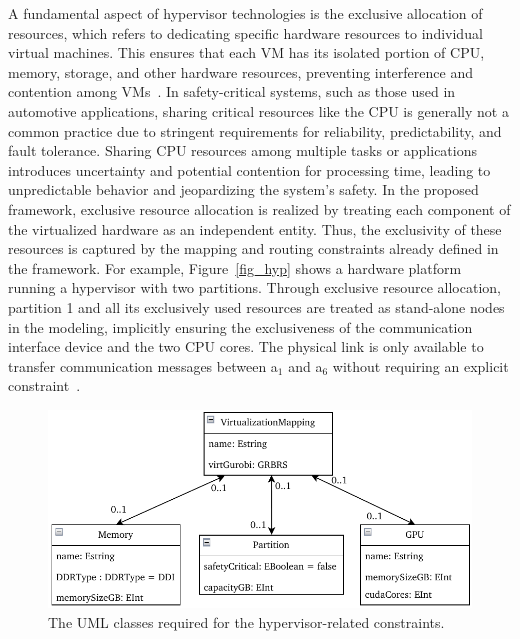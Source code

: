         
        A fundamental aspect of hypervisor technologies is the exclusive allocation of resources, which refers to dedicating specific hardware resources to individual virtual machines. This ensures that each VM has its isolated portion of CPU, memory, storage, and other hardware resources, preventing interference and contention among VMs~\cite{9968908}.
        In safety-critical systems, such as those used in automotive applications, sharing critical resources like the CPU is generally not a common practice due to stringent requirements for reliability, predictability, and fault tolerance. Sharing CPU resources among multiple tasks or applications introduces uncertainty and potential contention for processing time, leading to unpredictable behavior and jeopardizing the system's safety.
        In the proposed framework, exclusive resource allocation is realized by treating each component of the virtualized hardware as an independent entity. Thus, the exclusivity of these resources is captured by the mapping and routing constraints already defined in the framework. For example, Figure~\ref{fig_hyp} shows a hardware platform running a hypervisor with two partitions. Through exclusive resource allocation, partition 1 and all its exclusively used resources are treated as stand-alone nodes in the modeling, implicitly ensuring the exclusiveness of the communication interface device and the two CPU cores. The physical link is only available to transfer communication messages between a$_1$ and a$_6$ without requiring an explicit constraint~\cite{10588416}.
        
            
        
    
        


            \begin{figure}[b!]
    	\centering
    	\includegraphics[width=1\textwidth]{figures/metamodel_hypervisor.pdf}
    	\caption{ The UML classes required for the hypervisor-related constraints.}
    	\label{fig_uml}
        \end{figure}







